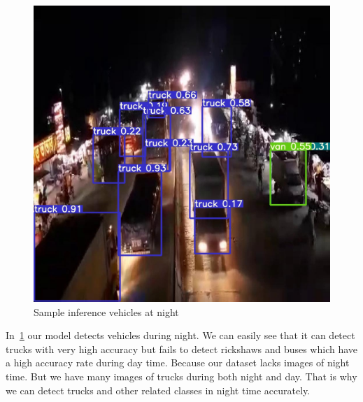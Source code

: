 \begin{figure}[h]
    \centering
    \includegraphics[max width=\textwidth]{images/ours/3 (1).jpg}
   \caption[Sample Inference of Vehicles 6]{ Sample inference vehicles at night}
    \label{fig:inference34567}
\end{figure}

In~\ref{fig:inference34567} our model detects vehicles during night. We can easily see that it can detect trucks with very high accuracy but fails to detect rickshaws and buses which have a high accuracy rate during day time. Because our dataset lacks images of night time. But we have many images of trucks during both night and day. That is why we can detect trucks and other related classes in night time accurately.

\newpage

